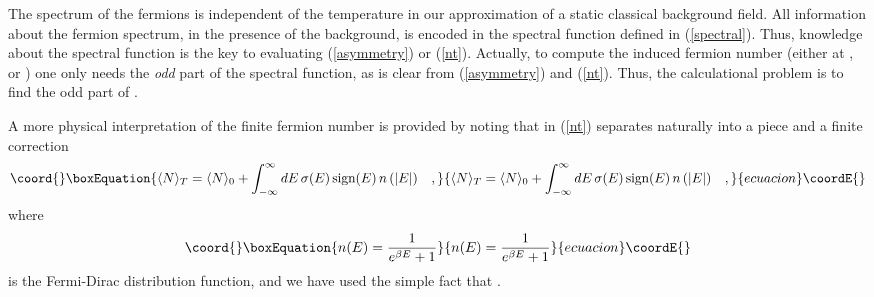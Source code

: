 \documentclass[a4paper,prd]{revtex4}
\begin{document}
The spectrum of the fermions is independent of the temperature in our approximation of
a static classical background field. All information about the fermion spectrum, in
the presence of the background, is encoded in the spectral function 
\coordHE{} defined in
(\ref{spectral}). Thus, knowledge about the spectral function
\coordHE{} is the key to evaluating (\ref{asymmetry}) or
(\ref{nt}). Actually, to compute the induced fermion number (either at
\coordHE{}, or \coordHE{}) one only needs the {\it odd} part of the spectral
function, as is clear from (\ref{asymmetry}) and (\ref{nt}). Thus, the
calculational problem is to find the odd part of \coordHE{}. 


A more physical interpretation of the finite \coordHE{} fermion number
\coordHE{} is provided by noting \cite{dr,leipzig} that 
\coordHE{} in (\ref{nt}) separates naturally into a
\coordHE{} piece and a finite \coordHE{} correction
\begin{equation}\coord{}\boxEquation{
\langle N\rangle _T=\langle N\rangle _0 +\int_{-\infty}^{\infty}dE \,\sigma (E) 
\,\textrm{sign}(E)\, n\,(|E|)\quad ,
\label{split}
}{
\langle N\rangle _T=\langle N\rangle _0 +\int_{-\infty}^{\infty}dE \,\sigma (E) 
\,\textrm{sign}(E)\, n\,(|E|)\quad ,
}{ecuacion}\coordE{}\end{equation}
where
\begin{equation}\coord{}\boxEquation{
n(E)=\frac{1}{e^{\beta E}+1}
\label{fd}
}{
n(E)=\frac{1}{e^{\beta E}+1}
}{ecuacion}\coordE{}\end{equation}
is the Fermi-Dirac distribution function, and we have used the simple fact that
\coordHE{}.
\end{document}
